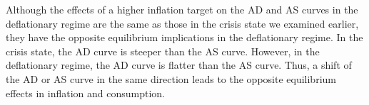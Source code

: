 \documentclass[11pt]{article}
\begin{document}
	Although the effects of a higher inflation target on the AD and AS curves in the deflationary regime are the same as those in the crisis state we examined earlier, they have the opposite equilibrium implications in the deflationary regime. In the crisis state, the AD curve is steeper than the AS curve. However, in the deflationary regime, the AD curve is flatter than the AS curve. Thus, a shift of the AD or AS curve in the same direction leads to the opposite equilibrium effects in inflation and consumption.
	
	
	
	
\end{document}
